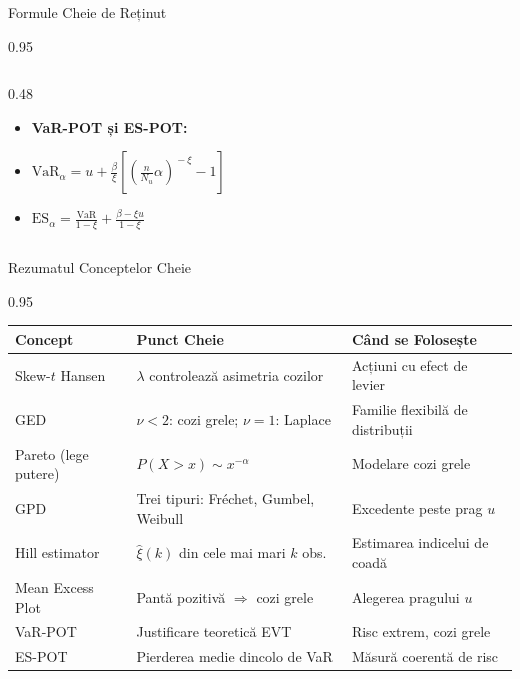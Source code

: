 \documentclass[9pt, aspectratio=169, t]{beamer}
\begin{document}
\begin{frame}{Formule Cheie de Reținut}
\begin{cminipage}{0.95\textwidth}
\begin{columns}[T]
\begin{column}{0.48\textwidth}
            \begin{itemize}\setlength{\itemsep}{0pt}
                \item \textbf{VaR-POT și ES-POT:}
            \end{itemize}
            \begin{itemize}\setlength{\itemsep}{0pt}
                \item $\text{VaR}_\alpha = u + \frac{\beta}{\xi}\!\left[\!\left(\frac{n}{N_u}\alpha\right)^{\!-\xi}\!\!-1\right]$
                \item $\text{ES}_\alpha = \frac{\text{VaR}}{1-\xi} + \frac{\beta - \xi u}{1-\xi}$
            \end{itemize}
        \end{column}
    \end{columns}
    \end{cminipage}
\end{frame}

\begin{frame}{Rezumatul Conceptelor Cheie}
    \begin{cminipage}{0.95\textwidth}
    \begin{center}
    \small
    \begin{tabular}{lll}
        \toprule
        \textbf{Concept} & \textbf{Punct Cheie} & \textbf{Când se Folosește} \\
        \midrule
        Skew-$t$ Hansen & $\lambda$ controlează asimetria cozilor & Acțiuni cu efect de levier \\
        GED & $\nu < 2$: cozi grele; $\nu = 1$: Laplace & Familie flexibilă de distribuții \\
        Pareto (lege putere) & $P(X > x) \sim x^{-\alpha}$ & Modelare cozi grele \\
        GPD & Trei tipuri: Fréchet, Gumbel, Weibull & Excedente peste prag $u$ \\
        \midrule
        Hill estimator & $\hat{\xi}(k)$ din cele mai mari $k$ obs. & Estimarea indicelui de coadă \\
        Mean Excess Plot & Pantă pozitivă $\Rightarrow$ cozi grele & Alegerea pragului $u$ \\
        \midrule
        VaR-POT & Justificare teoretică EVT & Risc extrem, cozi grele \\
        ES-POT & Pierderea medie dincolo de VaR & Măsură coerentă de risc \\
        \bottomrule
    \end{tabular}
    \end{center}
    \end{cminipage}
\end{frame}
\end{document}
